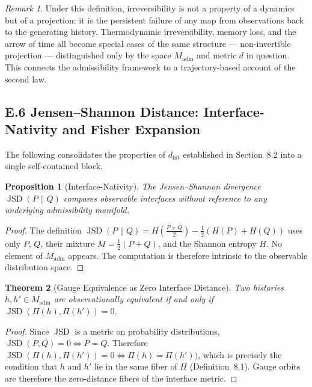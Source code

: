 \documentclass[12pt,a4paper]{article}
\newtheorem{theorem}{Theorem}[section]
\newtheorem{proposition}[theorem]{Proposition}
\theoremstyle{remark}
\newtheorem{remark}{Remark}[section]
\begin{document}
\begin{remark}
Under this definition, irreversibility is not a property of a dynamics but
of a projection: it is the persistent failure of any map from observations
back to the generating history. Thermodynamic irreversibility, memory loss,
and the arrow of time all become special cases of the same structure ---
non-invertible projection --- distinguished only by the space $M_{\mathrm{adm}}$
and metric $d$ in question. This connects the admissibility framework to a
trajectory-based account of the second law.
\end{remark}

\subsection*{E.6 Jensen--Shannon Distance: Interface-Nativity and Fisher Expansion}

The following consolidates the properties of $d_{\mathrm{int}}$ established
in Section~8.2 into a single self-contained block.

\begin{proposition}[Interface-Nativity]
The Jensen--Shannon divergence $\operatorname{JSD}(P \| Q)$ compares
observable interfaces without reference to any underlying admissibility
manifold.
\end{proposition}

\begin{proof}
The definition $\operatorname{JSD}(P \| Q) = H(\frac{P+Q}{2}) - \frac{1}{2}(H(P) +
H(Q))$ uses only $P$, $Q$, their mixture $M = \frac{1}{2}(P+Q)$, and the
Shannon entropy $H$. No element of $M_{\mathrm{adm}}$ appears. The
computation is therefore intrinsic to the observable distribution space.
\end{proof}

\begin{theorem}[Gauge Equivalence as Zero Interface Distance]
Two histories $h, h' \in M_{\mathrm{adm}}$ are observationally equivalent
if and only if $\operatorname{JSD}(\Pi(h), \Pi(h')) = 0$.
\end{theorem}

\begin{proof}
Since $\operatorname{JSD}$ is a metric on probability distributions,
$\operatorname{JSD}(P, Q) = 0 \iff P = Q$. Therefore
$\operatorname{JSD}(\Pi(h), \Pi(h')) = 0 \iff \Pi(h) = \Pi(h'))$,
which is precisely the condition that $h$ and $h'$ lie in the same fiber
of $\Pi$ (Definition~8.1). Gauge orbits are therefore the zero-distance
fibers of the interface metric.
\end{proof}
\end{document}
